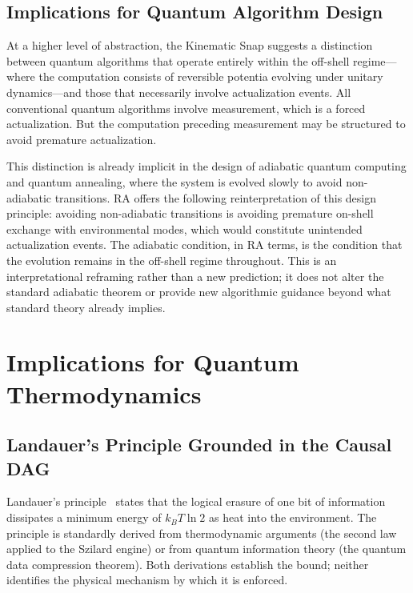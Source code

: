 \documentclass[11pt,a4paper]{article}
\theoremstyle{plain}
\theoremstyle{definition}
\theoremstyle{remark}
\begin{document}
\subsection{Implications for Quantum Algorithm Design}

At a higher level of abstraction, the Kinematic Snap suggests a distinction
between quantum algorithms that operate entirely within the off-shell regime---
where the computation consists of reversible potentia evolving under unitary
dynamics---and those that necessarily involve actualization events. All
conventional quantum algorithms involve measurement, which is a forced
actualization. But the computation preceding measurement may be structured to
avoid premature actualization.

This distinction is already implicit in the design of adiabatic quantum computing
and quantum annealing, where the system is evolved slowly to avoid non-adiabatic
transitions. RA offers the following reinterpretation of this design principle:
avoiding non-adiabatic transitions is avoiding premature on-shell exchange with
environmental modes, which would constitute unintended actualization events.
The adiabatic condition, in RA terms, is the condition that the evolution remains
in the off-shell regime throughout. This is an interpretational reframing rather
than a new prediction; it does not alter the standard adiabatic theorem or provide
new algorithmic guidance beyond what standard theory already implies.

\section{Implications for Quantum Thermodynamics}
\label{sec:thermodynamics}

\subsection{Landauer's Principle Grounded in the Causal DAG}
\label{sec:landauer}

Landauer's principle~\citep{Landauer1961} states that the logical erasure of one
bit of information dissipates a minimum energy of $k_B T \ln 2$ as heat into the
environment. The principle is standardly derived from thermodynamic arguments
(the second law applied to the Szilard engine) or from quantum information theory
(the quantum data compression theorem). Both derivations establish the bound; 
neither identifies the physical mechanism by which it is enforced.
\end{document}
